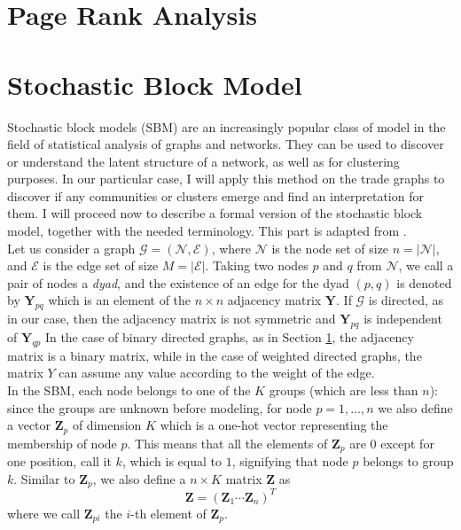 \pagebreak
\section{Page Rank Analysis}




\pagebreak
\section{Stochastic Block Model}\label{sec:sbm}
Stochastic block models (SBM) are an increasingly popular class of model in the field of statistical analysis of graphs and networks. They can be used to discover or understand the latent structure of a network, as well as for clustering purposes. In our particular case, I will apply this method on the trade graphs to discover if any communities or clusters emerge and find an interpretation for them.
I will proceed now to describe a formal version of the stochastic block model, together with the needed terminology. This part is adapted from \textcite{lee2019review}.\\
Let us consider a graph $\mathcal{G} = (\mathcal{N},\mathcal{E})$, where $\mathcal{N}$ is the node set of size $n = |\mathcal{N}|$, and $\mathcal{E}$ is the edge set of size $M = |\mathcal{E}|$. Taking two nodes $p$ and $q$ from $\mathcal{N}$, we call a pair of nodes a \textit{dyad}, and the existence of an edge for the dyad $(p,q)$ is denoted by $\mathbf{Y}_{pq}$ which is an element of the $n \times n$ adjacency matrix $\mathbf{Y}$. If $\mathcal{G}$ is directed, as in our case, then the adjacency matrix is not symmetric and $\mathbf{Y}_{pq}$ is independent of $\mathbf{Y}_{qp}$ In the case of binary directed graphs, as in Section \ref{}, the adjacency matrix is a binary matrix, while in the case of weighted directed graphs, the matrix $Y$ can assume any value according to the weight of the edge.\\
In the SBM, each node belongs to one of the $K$ groups (which are less than $n$): since the groups are unknown before modeling, for node $p = 1,\ldots,n$ we also define a vector $\mathbf{Z}_p$ of dimension $K$ which is a one-hot vector representing the membership of node $p$. This means that all the elements of $\mathbf{Z}_{p}$ are 0 except for one position, call it $k$, which is equal to $1$, signifying that node $p$ belongs to group $k$.
Similar to $\mathbf{Z}_{p}$, we also define a $n \times K$ matrix $\mathbf{Z}$ as
\[
    \mathbf{Z} = (\mathbf{Z}_1 \cdots \mathbf{Z}_n)^T
\]
where we call $\mathbf{Z}_{pi}$ the $i$-th element of $\mathbf{Z}_p$.\\
